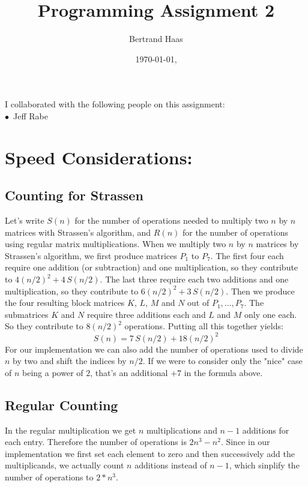 \documentclass{article}
\title{Programming Assignment 2}
\author{Bertrand Haas}
\date{\today,  \ampmtime}
\begin{document}
\maketitle


\begin{center}
I collaborated with the following people on this assignment:\\
$\bullet$\ Jeff Rabe
\end{center}

\section{Speed Considerations:}
\subsection{Counting for Strassen}
Let's write $ S(n) $ for the number of operations needed to multiply two $ n $ by $ n $ matrices with Strassen's algorithm, and $ R(n) $ for the number of operations using regular matrix multiplications.  
When we multiply two $ n $ by $ n $ matrices by Strassen's algorithm, we first produce matrices $ P_1 $ to $ P_7 $.  
The first four each require one addition (or subtraction) and one multiplication, so they contribute to $ 4 (n/2)^2 + 4\, S(n/2) $.
The last three require each two additions and one multiplication, so they contribute to $ 6 (n/2)^2 + 3\, S(n/2) $.
Then we produce the four resulting block matrices $ K $, $ L $, $ M $ and $ N $ out of $ P_1, \ldots, P_7 $.  
The submatrices $ K $ and $ N $ require three additions each and $ L $ and $ M $ only one each.
So they contribute to $ 8 (n/2)^2 $ operations.
Putting all this together yields:
\begin{equation}
\label{rec_eqt}
S(n) = 7\, S(n/2) + 18(n/2)^2
\end{equation}
For our implementation we can also add the number of operations used to divide $ n $ by two and shift the indices by $ n/2 $.
If we were to consider only the "nice" case of $ n $ being a power of $ 2 $, that's an additional $ +7 $ in the formula above.
\subsection{Regular Counting}
In the regular multiplication we get $ n $ multiplications and $ n-1 $ additions for each entry.  
Therefore the number of operations is $ 2 n^3 - n^2 $.  
Since in our implementation we first set each element to zero and then successively add the multiplicands, we actually count $ n $ additions instead of $ n-1 $, which sinplify the number of operations to $ 2*n^3 $.
\end{document}
